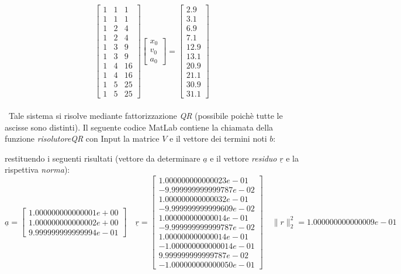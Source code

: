 	\[
		\begin{bmatrix}
			1 & 1 & 1 \\
			1 & 1 & 1 \\
			1 & 2 & 4 \\
			1 & 2 & 4 \\
			1 & 3 & 9 \\
			1 & 3 & 9 \\
			1 & 4 & 16 \\
			1 & 4 & 16 \\
			1 & 5 & 25 \\
			1 & 5 & 25 				
		\end{bmatrix}
		\begin{bmatrix}
			x_0 \\
			v_0 \\
			a_0
		\end{bmatrix}=
		\begin{bmatrix}
			2.9 \\
			3.1 \\
			6.9 \\
			7.1 \\
			12.9 \\
			13.1 \\
			20.9 \\
			21.1 \\
			30.9 \\
			31.1
		\end{bmatrix}
	\]\\\
Tale sistema si risolve mediante fattorizzazione \textit{QR} (possibile poichè tutte le ascisse sono distinti).
Il seguente codice MatLab contiene la chiamata della funzione \textit{risolutoreQR} con Input la matrice $V$ e il vettore dei termini noti $b$:
	
restituendo i seguenti risultati (vettore da determinare $\underline{a}$ e il vettore \textit{residuo} $\underline{r}$ e la rispettiva \textit{norma}):
	\[
		\underline{a}=\begin{bmatrix}
			1.000000000000001e+00 \\
			1.000000000000002e+00 \\
	 	    9.999999999999994e-01
		\end{bmatrix}
		\quad
		\underline{r}=\begin{bmatrix}
			1.000000000000023e-01 \\
   			-9.999999999999787e-02 \\
     		1.000000000000032e-01 \\
    		-9.999999999999609e-02 \\
     		1.000000000000014e-01 \\
    		-9.999999999999787e-02 \\
     		1.000000000000014e-01 \\
    		-1.000000000000014e-01 \\
     		9.999999999999787e-02 \\
    		-1.000000000000050e-01
		\end{bmatrix}
		\quad
		\|r\|_2^2 = 1.000000000000009e-01
	\]
